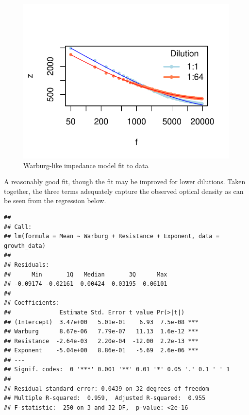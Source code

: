 \documentclass{article}\usepackage[]{graphicx}\usepackage[]{color}
\makeatletter
\def\maxwidth{ %
  \ifdim\Gin@nat@width>\linewidth
    \linewidth
  \else
    \Gin@nat@width
  \fi
}
\newenvironment{kframe}{%
 \def\at@end@of@kframe{}%
 \ifinner\ifhmode%
  \def\at@end@of@kframe{\end{minipage}}%
  \begin{minipage}{\columnwidth}%
 \fi\fi%
 \def\FrameCommand##1{\hskip\@totalleftmargin \hskip-\fboxsep
 \colorbox{shadecolor}{##1}\hskip-\fboxsep
     \hskip-\linewidth \hskip-\@totalleftmargin \hskip\columnwidth}%
 \MakeFramed {\advance\hsize-\width
   \@totalleftmargin\z@ \linewidth\hsize
   \@setminipage}}%
 {\par\unskip\endMakeFramed%
 \at@end@of@kframe}
\newenvironment{knitrout}{}{} %
\makeatother
\begin{document}
\begin{knitrout}
\color{fgcolor}\begin{figure}[]


{\centering \includegraphics[width=\maxwidth]{figure/nlsmod_fit} 

}

\caption[Warburg-like impedance model fit to data]{Warburg-like impedance model fit to data\label{fig:nlsmod_fit}}
\end{figure}


\end{knitrout}


A reasonably good fit, though the fit may be improved for lower dilutions. Taken together, the three terms adequately capture the observed optical density as can be seen from the regression below. 

\begin{knitrout}
\color{fgcolor}\begin{kframe}
\begin{verbatim}
## 
## Call:
## lm(formula = Mean ~ Warburg + Resistance + Exponent, data = growth_data)
## 
## Residuals:
##      Min       1Q   Median       3Q      Max 
## -0.09174 -0.02161  0.00424  0.03195  0.06101 
## 
## Coefficients:
##              Estimate Std. Error t value Pr(>|t|)    
## (Intercept)  3.47e+00   5.01e-01    6.93  7.5e-08 ***
## Warburg      8.67e-06   7.79e-07   11.13  1.6e-12 ***
## Resistance  -2.64e-03   2.20e-04  -12.00  2.2e-13 ***
## Exponent    -5.04e+00   8.86e-01   -5.69  2.6e-06 ***
## ---
## Signif. codes:  0 '***' 0.001 '**' 0.01 '*' 0.05 '.' 0.1 ' ' 1
## 
## Residual standard error: 0.0439 on 32 degrees of freedom
## Multiple R-squared:  0.959,	Adjusted R-squared:  0.955 
## F-statistic:  250 on 3 and 32 DF,  p-value: <2e-16
\end{verbatim}
\end{kframe}
\end{knitrout}
\end{document}
